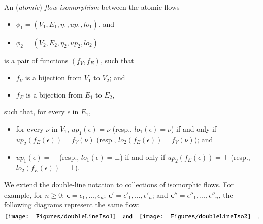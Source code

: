 
\newcommand{\up}{{\mathit up}}
\newcommand{\lo}{{\mathit lo}}

\TODO{Define: $\up$ and $\lo$.}

\begin{definition}\label{definition:FlowIsomorphism}
An (\emph{atomic}) \emph{flow isomorphism} between the atomic flows
\begin{itemize}
 \item $\phi_1=(V_1,E_1,\eta_1,\up_1,\lo_1)$, and
 \item $\phi_2=(V_2,E_2,\eta_2,\up_2,\lo_2)$
\end{itemize}
is a pair of functions $(f_V,f_E)$, such that
\begin{itemize}
\item $f_V$ is a bijection from $V_1$ to $V_2$; and 
\item $f_E$ is a bijection from $E_1$ to $E_2$,
\end{itemize}
such that, for every $\epsilon$ in $E_1$,
\begin{itemize}
\item for every $\nu$ in $V_1$, $\up_1(\epsilon)=\nu$ (resp., $\lo_1(\epsilon)=\nu$) if and only if $\up_2(f_E(\epsilon))=f_V(\nu)$ (resp., $\lo_2(f_E(\epsilon))=f_V(\nu)$); and
\item $\up_1(\epsilon)=\top$ (resp., $\lo_1(\epsilon)=\bot$) if and only if $\up_2(f_E(\epsilon))=\top$ (resp., $\lo_2(f_E(\epsilon))=\bot$).
\end{itemize}
\end{definition}

\begin{notation}
We extend the double-line notation to collections of isomorphic flows. For example, for $n\ge0$; $\boldsymbol{\epsilon}=\epsilon_1,\dots,\epsilon_n$; $\boldsymbol{\epsilon'}=\epsilon'_1,\dots,\epsilon'_n$; and $\boldsymbol{\epsilon''}=\epsilon''_1,\dots,\epsilon''_n$, the following diagrams represent the same flow:
\[
\vcenter{\hbox{\texttt{[image: Figures/doubleLineIso1]}}}
\quad\mbox{and}\quad
\vcenter{\hbox{\texttt{[image: Figures/doubleLineIso2]}}}
\quad.
\]
\end{notation}


